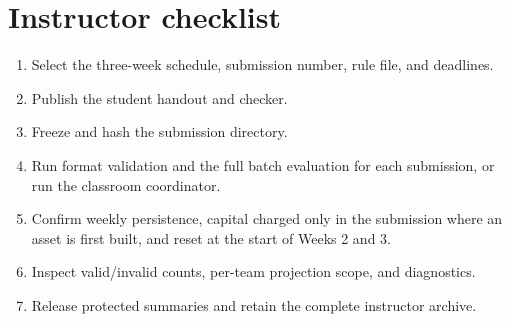 \documentclass[12pt]{article}
\begin{document}
\section{Instructor checklist}

\begin{enumerate}[leftmargin=*]
  \item Select the three-week schedule, submission number, rule file, and deadlines.
  \item Publish the student handout and checker.
  \item Freeze and hash the submission directory.
  \item Run format validation and the full batch evaluation for each submission,
  or run the classroom coordinator.
  \item Confirm weekly persistence, capital charged only in the submission
  where an asset is first built, and reset at the start of Weeks 2 and 3.
  \item Inspect valid/invalid counts, per-team projection scope, and diagnostics.
  \item Release protected summaries and retain the complete instructor archive.
\end{enumerate}



\end{document}
